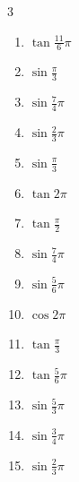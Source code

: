 \begin{multicols}{3}
\begin{enumerate}
  \item $\displaystyle \tan{\frac{11}{6}\pi}$

  \item $\displaystyle \sin{\frac{\pi}{3}}$

  \item $\displaystyle \sin{\frac{7}{4}\pi}$

  \item $\displaystyle \sin{\frac{2}{3}\pi}$

  \item $\displaystyle \sin{\frac{\pi}{3}}$

  \item $\displaystyle \tan{2\pi}$
        \phantom{$\displaystyle =0$}

  \item $\displaystyle \tan{\frac{\pi}{2}}$
        \phantom{$\displaystyle \quad なし$}

  \item $\displaystyle \sin{\frac{7}{4}\pi}$

  \item $\displaystyle \sin{\frac{5}{6}\pi}$

  \item $\displaystyle \cos{2\pi}$
        \phantom{$\displaystyle =1$}

  \item $\displaystyle \tan{\frac{\pi}{3}}$

  \item $\displaystyle \tan{\frac{5}{6}\pi}$

  \item $\displaystyle \sin{\frac{5}{3}\pi}$

  \item $\displaystyle \sin{\frac{3}{4}\pi}$

  \item $\displaystyle \sin{\frac{2}{3}\pi}$


\end{enumerate}
\end{multicols}
